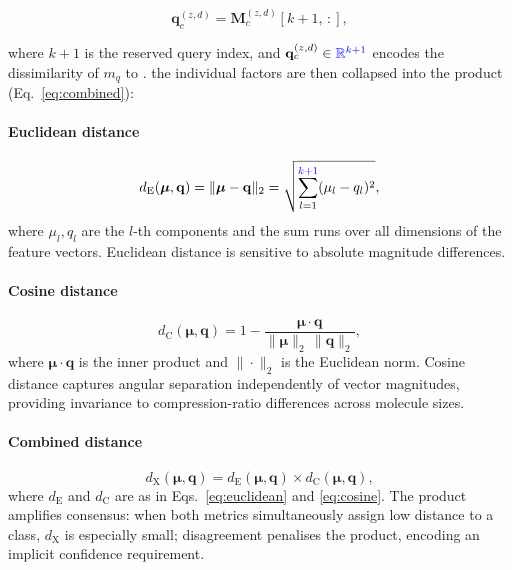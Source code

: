 \begin{equation}
  \mathbf{q}_c^{(z,d)}
  = \mathbf{M}^{(z,d)}_c[k+1,\,:],
  \label{eq:query}
\end{equation}

\noindent where $k+1$ is the reserved query index, and
$\mathbf{q}_c^{(z,d)} \in \textcolor{blue}{\mathbb{R}^{k+1}}$ encodes the
dissimilarity of $m_q$ to .
the individual factors are then collapsed into the product
(Eq.~\eqref{eq:combined}):

\paragraph{Euclidean distance}
\begin{equation}
  d_{\mathrm{E}}(\boldsymbol{\mu},\mathbf{q})
  = \|\boldsymbol{\mu} - \mathbf{q}\|_2
  = \sqrt{\sum_{l=1}^{\textcolor{blue}{k+1}}(\mu_l - q_l)^2},
  \label{eq:euclidean}
\end{equation}
where $\mu_l, q_l$ are the $l$-th components and the sum runs over
all dimensions of the feature vectors. Euclidean distance is sensitive to absolute
magnitude differences.

\paragraph{Cosine distance}
\begin{equation}
  d_{\mathrm{C}}(\boldsymbol{\mu},\mathbf{q})
  = 1 - \frac{\boldsymbol{\mu} \cdot \mathbf{q}}
             {\|\boldsymbol{\mu}\|_2\,\|\mathbf{q}\|_2},
  \label{eq:cosine}
\end{equation}
where $\boldsymbol{\mu} \cdot \mathbf{q}$ is the inner product and
$\|\cdot\|_2$ is the Euclidean norm. Cosine distance captures
angular separation independently of vector magnitudes, providing
invariance to compression-ratio differences across molecule sizes.

\paragraph{Combined distance}
\begin{equation}
  d_{\mathrm{X}}(\boldsymbol{\mu},\mathbf{q})
  = d_{\mathrm{E}}(\boldsymbol{\mu},\mathbf{q})
    \times
    d_{\mathrm{C}}(\boldsymbol{\mu},\mathbf{q}),
  \label{eq:combined}
\end{equation}
where $d_{\mathrm{E}}$ and $d_{\mathrm{C}}$ are as in
Eqs.~\eqref{eq:euclidean} and \eqref{eq:cosine}. The product
amplifies consensus: when both metrics simultaneously assign low
distance to a class, $d_{\mathrm{X}}$ is especially small;
disagreement penalises the product, encoding an implicit confidence
requirement.

